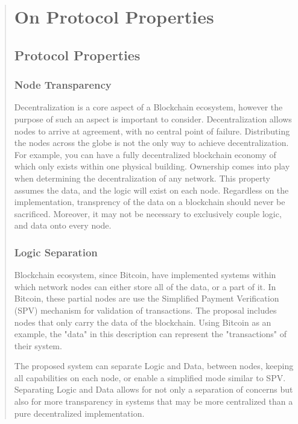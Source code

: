 \documentclass[12pt, titlepage, twocolumn]{report}
\begin{document}
\begin{quotation}
\chapter{On Protocol Properties}
 
\section{Protocol Properties}

\subsection{Node Transparency}
Decentralization is a core aspect of a Blockchain ecosystem, however the purpose of such an aspect is important to consider. Decentralization allows nodes to arrive at agreement, with no central point of failure. Distributing the nodes across the globe is not the only way to achieve decentralization. For example, you can have a fully decentralized blockchain economy of which only exists within one physical building. Ownership comes into play when determining the decentralization of any network. This property assumes the data, and the logic will exist on each node. Regardless on the implementation, transprency of the data on a blockchain should never be sacrificed. Moreover, it may not be necessary to exclusively couple logic, and data onto every node.



\subsection{Logic Separation} \label{logicsep}
Blockchain ecosystem, since Bitcoin, have implemented systems within which network nodes can either store all of the data, or a part of it. In Bitcoin, these partial nodes are use the Simplified Payment Verification (SPV) mechanism for validation of transactions. The proposal includes nodes that only carry the data of the blockchain. Using Bitcoin as an example, the "data" in this description can represent the "transactions" of their system. 

The proposed system can separate Logic and Data, between nodes, keeping all capabilities on each node, or enable a simplified mode similar to SPV. Separating Logic and Data allows for not only a separation of concerns but also for more transparency in systems that may be more centralized than a pure decentralized implementation.


\end{quotation}
\end{document}
